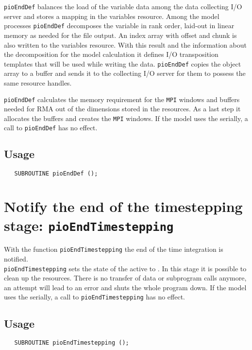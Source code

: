 {\tt pioEndDef} balances the load of the variable data among the data collecting 
I/O server and stores a mapping 
in the variables {\CDI} resource. Among the model processes {\tt pioEndDef} 
decomposes the variable in rank order, laid-out in linear memory as needed 
for the file output. An index 
array with offset and chunk is also written to the variables resource. With this 
result and the information about the decomposition for the model calculation 
it defines I/O transposition templates that will be used while writing the data. 
{\tt pioEndDef} copies the {\CDI} 
object array to a buffer and sends it to the collecting I/O server for them to 
possess the same resource handles. \smallskip

{\tt pioEndDef} calculates the memory requirement for the {\tt MPI} windows and 
buffers needed for RMA out of the dimensions stored in the {\CDI} resources. 
As a last step it allocates the buffers and creates the {\tt MPI} windows.  If 
the model uses the {\CDI} serially, a call to {\tt pioEndDef} has no effect. 

\subsection*{Usage}
\begin{verbatim}
   SUBROUTINE pioEndDef ();
\end{verbatim}

\section{Notify the end of the timestepping stage: {\tt pioEndTimestepping}}
\label{pioEndTimestepping}
With the function {\tt pioEndTimestepping} the end of the time integration 
is notified. \\
{\tt pioEndTimestepping} sets the state of the active 
{} 
to {}. In this stage it is possible 
to clean up the {\CDI} 
resources. There is no transfer of data or subprogram calls anymore, an attempt 
will lead to an error and shuts the whole program down. If the model uses the 
{\CDI} serially, a call to {\tt pioEndTimestepping} has no effect.

\subsection*{Usage}
\begin{verbatim}
   SUBROUTINE pioEndTimestepping ();
\end{verbatim}

